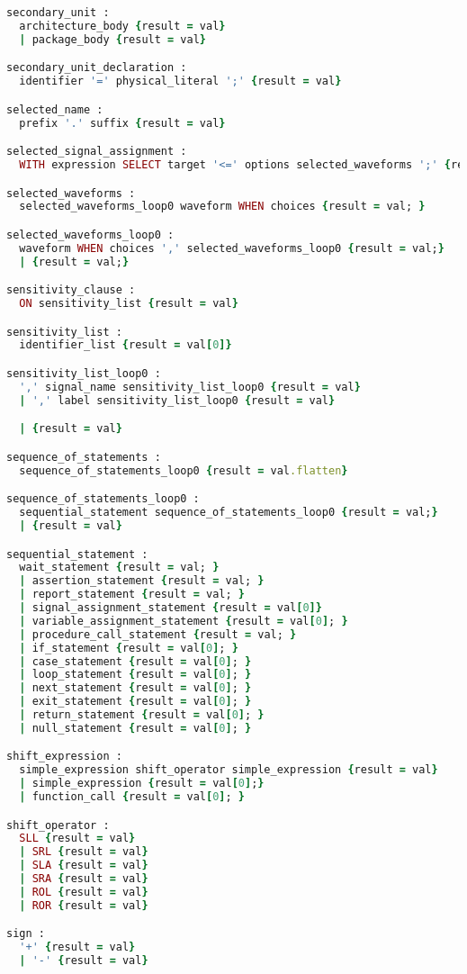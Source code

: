 \begin{lstlisting}[language=Ruby, style=rubystyle]
secondary_unit :
  architecture_body {result = val}
  | package_body {result = val}

secondary_unit_declaration :
  identifier '=' physical_literal ';' {result = val}

selected_name :
  prefix '.' suffix {result = val}

selected_signal_assignment :
  WITH expression SELECT target '<=' options selected_waveforms ';' {result = val}

selected_waveforms :
  selected_waveforms_loop0 waveform WHEN choices {result = val; }

selected_waveforms_loop0 :
  waveform WHEN choices ',' selected_waveforms_loop0 {result = val;}
  | {result = val;}

sensitivity_clause :
  ON sensitivity_list {result = val}

sensitivity_list :
  identifier_list {result = val[0]}

sensitivity_list_loop0 :
  ',' signal_name sensitivity_list_loop0 {result = val}
  | ',' label sensitivity_list_loop0 {result = val}

  | {result = val}

sequence_of_statements :
  sequence_of_statements_loop0 {result = val.flatten}

sequence_of_statements_loop0 :
  sequential_statement sequence_of_statements_loop0 {result = val;}
  | {result = val}

sequential_statement :
  wait_statement {result = val; }
  | assertion_statement {result = val; }
  | report_statement {result = val; }
  | signal_assignment_statement {result = val[0]}
  | variable_assignment_statement {result = val[0]; }
  | procedure_call_statement {result = val; }
  | if_statement {result = val[0]; }
  | case_statement {result = val[0]; }
  | loop_statement {result = val[0]; }
  | next_statement {result = val[0]; }
  | exit_statement {result = val[0]; }
  | return_statement {result = val[0]; }
  | null_statement {result = val[0]; }

shift_expression :
  simple_expression shift_operator simple_expression {result = val}
  | simple_expression {result = val[0];}
  | function_call {result = val[0]; }

shift_operator :
  SLL {result = val}
  | SRL {result = val}
  | SLA {result = val}
  | SRA {result = val}
  | ROL {result = val}
  | ROR {result = val}

sign :
  '+' {result = val}
  | '-' {result = val}


\end{lstlisting}
